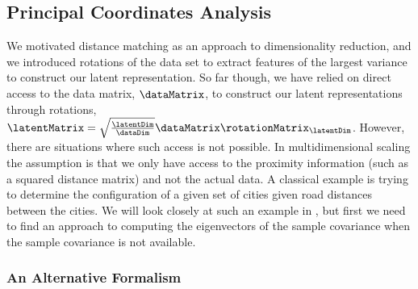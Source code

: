 \subsection{Principal Coordinates Analysis}

We motivated distance matching as an approach to dimensionality
reduction, and we introduced rotations of the data set to extract
features of the largest variance to construct our latent
representation. So far though, we have relied on direct access to the
data matrix, $\dataMatrix$, to construct our latent representations
through rotations, $\latentMatrix =
\sqrt{\frac{\latentDim}{\dataDim}}\dataMatrix\rotationMatrix_\latentDim$. However,
there are situations where such access is not possible. In
multidimensional scaling the
assumption is that we only have access to the proximity information
(such as a squared distance matrix) and not the actual data. A
classical example is trying to determine the configuration of a given
set of cities given road distances between the cities. We will look
closely at such an example in , but first we
need to find an approach to computing the eigenvectors of the sample
covariance when the sample covariance is not available.

\subsubsection{An Alternative Formalism}\label{sec:eigenvalueEquivalence}

